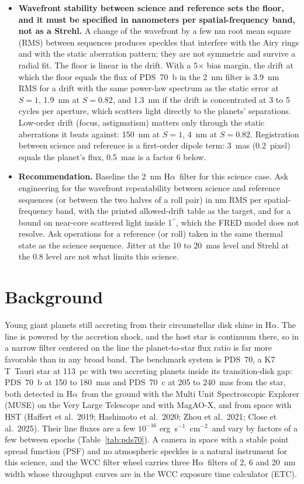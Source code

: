 \documentclass[11pt]{article}
\newcommand{\Ha}{H$\alpha$}
\newcommand{\ergcgs}{erg~s$^{-1}$~cm$^{-2}$}
\begin{document}
\begin{itemize}[leftmargin=*]
  \item \textbf{Wavefront stability between science and reference sets the floor, and it must be specified in nanometers per spatial-frequency band, not as a Strehl.} A change of the wavefront by a few nm root mean square (RMS) between sequences produces speckles that interfere with the Airy rings and with the static aberration pattern; they are not symmetric and survive a radial fit. The floor is linear in the drift. With a 5$\times$ bias margin, the drift at which the floor equals the flux of PDS~70~b in the 2~nm filter is 3.9~nm RMS for a drift with the same power-law spectrum as the static error at $S = 1$, 1.9~nm at $S = 0.82$, and 1.3~nm if the drift is concentrated at 3 to 5 cycles per aperture, which scatters light directly to the planets' separations. Low-order drift (focus, astigmatism) matters only through the static aberrations it beats against: 150~nm at $S = 1$, 4~nm at $S = 0.82$. Registration between science and reference is a first-order dipole term: 3~mas (0.2~pixel) equals the planet's flux, 0.5~mas is a factor 6 below.
  \item \textbf{Recommendation.} Baseline the 2~nm \Ha\ filter for this science case. Ask engineering for the wavefront repeatability between science and reference sequences (or between the two halves of a roll pair) in nm RMS per spatial-frequency band, with the printed allowed-drift table as the target, and for a bound on near-core scattered light inside 1$^{\prime\prime}$, which the FRED model does not resolve. Ask operations for a reference (or roll) taken in the same thermal state as the science sequence. Jitter at the 10 to 20~mas level and Strehl at the 0.8 level are not what limits this science.
\end{itemize}

\section*{Background}

Young giant planets still accreting from their circumstellar disk shine in \Ha. The line is powered by the accretion shock, and the host star is continuum there, so in a narrow filter centered on the line the planet-to-star flux ratio is far more favorable than in any broad band. The benchmark system is PDS~70, a K7 T~Tauri star at 113~pc with two accreting planets inside its transition-disk gap: PDS~70~b at 150 to 180~mas and PDS~70~c at 205 to 240~mas from the star, both detected in \Ha\ from the ground with the Multi Unit Spectroscopic Explorer (MUSE) on the Very Large Telescope and with MagAO-X, and from space with HST (Haffert et al.\ 2019; Hashimoto et al.\ 2020; Zhou et al.\ 2021; Close et al.\ 2025). Their line fluxes are a few $10^{-16}$ \ergcgs\ and vary by factors of a few between epochs (Table~\ref{tab:pds70}). A camera in space with a stable point spread function (PSF) and no atmospheric speckles is a natural instrument for this science, and the WCC filter wheel carries three \Ha\ filters of 2, 6 and 20~nm width whose throughput curves are in the WCC exposure time calculator (ETC).
\end{document}
